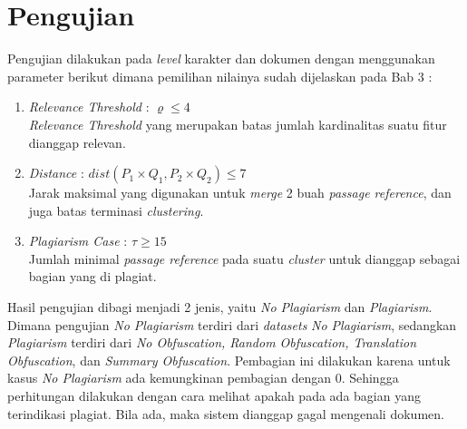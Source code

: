 \documentclass[../Book.tex]{subfiles}
\begin{document}
\section{Pengujian}
Pengujian dilakukan pada \textit{level} karakter dan dokumen dengan menggunakan parameter berikut dimana pemilihan nilainya sudah dijelaskan pada Bab 3 : 

\begin{enumerate}
	\item \textit{Relevance Threshold} : $\varrho \leq 4$\\
	\textit{Relevance Threshold} yang merupakan batas jumlah kardinalitas suatu fitur dianggap relevan.
	
	\item \textit{Distance} : $dist(P_{1} \times Q_{1},P_{2} \times Q_{2}) \leq 7$\\
	Jarak maksimal yang digunakan untuk \textit{merge} 2 buah \textit{passage reference}, dan juga batas terminasi \textit{clustering}.
	
	\item \textit{Plagiarism Case} : $\tau \geq 15$ \\
	Jumlah minimal \textit{passage reference} pada suatu \textit{cluster} untuk dianggap sebagai bagian yang di plagiat.
\end{enumerate}

\noindent Hasil pengujian dibagi menjadi 2 jenis, yaitu \textit{No Plagiarism} dan \textit{Plagiarism}. Dimana pengujian \textit{No Plagiarism} terdiri dari \textit{datasets} \textit{No Plagiarism}, sedangkan \textit{Plagiarism} terdiri dari \textit{No Obfuscation, Random Obfuscation, Translation Obfuscation}, dan \textit{Summary Obfuscation}. Pembagian ini dilakukan karena untuk kasus \textit{No Plagiarism} ada kemungkinan pembagian dengan 0. Sehingga perhitungan dilakukan dengan cara melihat apakah pada ada bagian yang terindikasi plagiat. Bila ada, maka sistem dianggap gagal mengenali dokumen. \\
\end{document}
